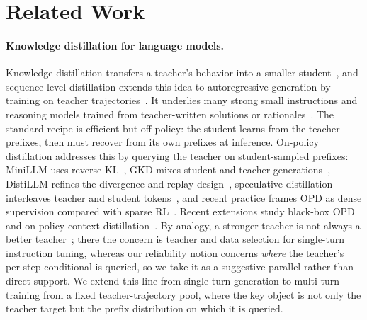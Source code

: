 \section{Related Work}

\paragraph{Knowledge distillation for language models.}
Knowledge distillation transfers a teacher's behavior into a smaller
student~\citep{hinton2015distilling}, and sequence-level distillation extends this idea to autoregressive generation by training on teacher trajectories~\citep{kim2016sequence}. It underlies many strong small instructions and
reasoning models trained from teacher-written solutions or
rationales~\citep{mitra2024orca,yue2023mammoth,yu2023metamath,hsieh2023distilling}.
The standard recipe is efficient but off-policy: the student learns from the teacher
prefixes, then must recover from its own prefixes at inference. On-policy distillation addresses this by querying the teacher on student-sampled prefixes:
MiniLLM uses reverse KL~\citep{gu2024minillm}, GKD mixes student and teacher
generations~\citep{agarwal2024gkd}, DistiLLM refines the divergence and replay
design~\citep{ko2024distillm,ko2025distillm2}, speculative distillation interleaves
teacher and student tokens~\citep{xu2024speculativekd}, and recent practice frames
OPD as dense supervision compared with sparse RL~\citep{thinkingmachines2025onpolicy}.
Recent extensions study black-box OPD and on-policy context
distillation~\citep{ye2025blackboxopd,ye2026opcd}.
By analogy, a stronger teacher is not always a better teacher~\citep{xu2024stronger};
there the concern is teacher and data selection for single-turn instruction tuning,
whereas our reliability notion concerns \emph{where} the teacher's per-step conditional
is queried, so we take it as a suggestive parallel rather than direct support. We extend this line from single-turn generation to
multi-turn training from a fixed teacher-trajectory pool, where the key object is not only the teacher target but the prefix distribution on which it is
queried.

